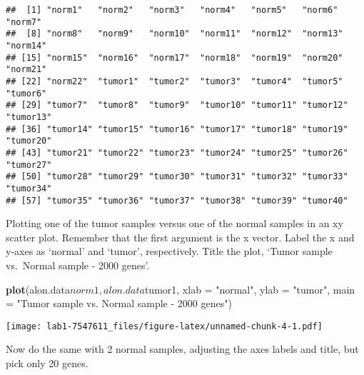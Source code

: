\documentclass[]{article}
\newenvironment{Shaded}{\begin{snugshade}}{\end{snugshade}}
\newcommand{\KeywordTok}[1]{\textcolor[rgb]{0.13,0.29,0.53}{\textbf{{#1}}}}
\newcommand{\DataTypeTok}[1]{\textcolor[rgb]{0.13,0.29,0.53}{{#1}}}
\newcommand{\DecValTok}[1]{\textcolor[rgb]{0.00,0.00,0.81}{{#1}}}
\newcommand{\StringTok}[1]{\textcolor[rgb]{0.31,0.60,0.02}{{#1}}}
\newcommand{\NormalTok}[1]{{#1}}
\begin{document}
\begin{verbatim}
##  [1] "norm1"   "norm2"   "norm3"   "norm4"   "norm5"   "norm6"   "norm7"  
##  [8] "norm8"   "norm9"   "norm10"  "norm11"  "norm12"  "norm13"  "norm14" 
## [15] "norm15"  "norm16"  "norm17"  "norm18"  "norm19"  "norm20"  "norm21" 
## [22] "norm22"  "tumor1"  "tumor2"  "tumor3"  "tumor4"  "tumor5"  "tumor6" 
## [29] "tumor7"  "tumor8"  "tumor9"  "tumor10" "tumor11" "tumor12" "tumor13"
## [36] "tumor14" "tumor15" "tumor16" "tumor17" "tumor18" "tumor19" "tumor20"
## [43] "tumor21" "tumor22" "tumor23" "tumor24" "tumor25" "tumor26" "tumor27"
## [50] "tumor28" "tumor29" "tumor30" "tumor31" "tumor32" "tumor33" "tumor34"
## [57] "tumor35" "tumor36" "tumor37" "tumor38" "tumor39" "tumor40"
\end{verbatim}

Plotting one of the tumor samples versus one of the normal samples in an
xy scatter plot. Remember that the first argument is the x vector. Label
the x and y-axes as `normal' and `tumor', respectively. Title the plot,
`Tumor sample vs.~Normal sample - 2000 genes'.

\begin{Shaded}
\begin{Highlighting}[]
\KeywordTok{plot}\NormalTok{(alon.data$norm1, alon.data$tumor1, }\DataTypeTok{xlab =} \StringTok{"normal"}\NormalTok{, }\DataTypeTok{ylab =} \StringTok{"tumor"}\NormalTok{,}
     \DataTypeTok{main =} \StringTok{"Tumor sample vs. Normal sample - 2000 genes"}\NormalTok{)}
\end{Highlighting}
\end{Shaded}

\texttt{[image: lab1-7547611\_files/figure-latex/unnamed-chunk-4-1.pdf]}

Now do the same with 2 normal samples, adjusting the axes labels and
title, but pick only 20 genes.

\begin{Shaded}
\end{Shaded}
\end{document}
